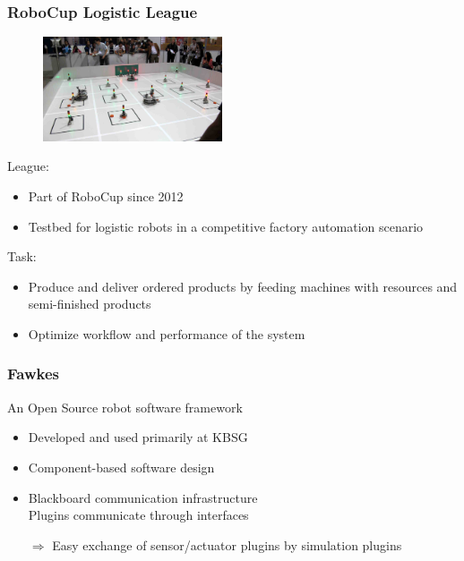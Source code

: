 \documentclass{beamer}
\begin{document}
\begin{frame}
\frametitle{RoboCup Logistic League}
\fboxsep=0pt
\noindent%
\begin{minipage}[]{0.48\linewidth}
\begin{figure}
\includegraphics[width=150pt,heigth=120pt]{pics/llsfLeague.png}\\
\end{figure}
\end{minipage}%
\hfill%
\begin{minipage}[]{0.48\linewidth}
League:
\begin{itemize}
\item Part of RoboCup since 2012
\item Testbed for logistic robots in a competitive factory automation scenario
\end{itemize}
Task:
\begin{itemize}
\item Produce and deliver ordered products by feeding machines with resources and semi-finished products
\item Optimize workflow and performance of the system
\end{itemize}
\end{minipage}
\end{frame}

\begin{frame}
\frametitle{Fawkes}
An Open Source robot software framework
\begin{itemize}
\item Developed and used primarily at KBSG
\item Component-based software design
\item Blackboard communication infrastructure\\ Plugins communicate through interfaces
\item[$\Rightarrow$] Easy exchange of sensor/actuator plugins by simulation plugins
\end{itemize}
\end{frame}
\end{document}

